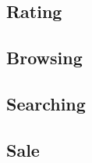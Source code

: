 \documentclass[12pt]{article}
\begin{document}
\subsection{Rating}

\subsection{Browsing}

\subsection{Searching}

\subsection{Sale}
\end{document}
